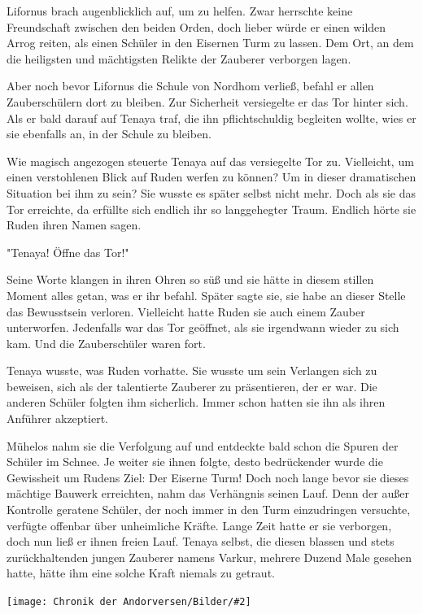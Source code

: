 \documentclass[10pt, a4paper, oneside]{book}
\newcommand{\bildmitts}[2][height=0.32\textwidth,width=0.48\textwidth,keepaspectratio]{%
    \begin{center}
        \texttt{[image: Chronik der Andorversen/Bilder/\#2]}
    \end{center}
}
\begin{document}
\begin{multicols}{2}
Lifornus brach augenblicklich auf, um zu helfen. Zwar herrschte keine Freundschaft zwischen den beiden Orden, doch lieber würde er einen wilden Arrog reiten, als einen Schüler in den Eisernen Turm zu lassen. Dem Ort, an dem die heiligsten und mächtigsten Relikte der Zauberer verborgen lagen.

Aber noch bevor Lifornus die Schule von Nordhom verließ, befahl er allen Zauberschülern dort zu bleiben. Zur Sicherheit versiegelte er das Tor hinter sich. Als er bald darauf auf Tenaya traf, die ihn pflichtschuldig begleiten wollte, wies er sie ebenfalls an, in der Schule zu bleiben.

Wie magisch angezogen steuerte Tenaya auf das versiegelte Tor zu. Vielleicht, um einen verstohlenen Blick auf Ruden werfen zu können? Um in dieser dramatischen Situation bei ihm zu sein? Sie wusste es später selbst nicht mehr. Doch als sie das Tor erreichte, da erfüllte sich endlich ihr so langgehegter Traum. Endlich hörte sie Ruden ihren Namen sagen.

"Tenaya! Öffne das Tor!"

Seine Worte klangen in ihren Ohren so süß und sie hätte in diesem stillen Moment alles getan, was er ihr befahl. Später sagte sie, sie habe an dieser Stelle das Bewusstsein verloren. Vielleicht hatte Ruden sie auch einem Zauber unterworfen. Jedenfalls war das Tor geöffnet, als sie irgendwann wieder zu sich kam. Und die Zauberschüler waren fort.

Tenaya wusste, was Ruden vorhatte. Sie wusste um sein Verlangen sich zu beweisen, sich als der talentierte Zauberer zu präsentieren, der er war. Die anderen Schüler folgten ihm sicherlich. Immer schon hatten sie ihn als ihren Anführer akzeptiert.

Mühelos nahm sie die Verfolgung auf und entdeckte bald schon die Spuren der Schüler im Schnee. Je weiter sie ihnen folgte, desto bedrückender wurde die Gewissheit um Rudens Ziel: Der Eiserne Turm! Doch noch lange bevor sie dieses mächtige Bauwerk erreichten, nahm das Verhängnis seinen Lauf. Denn der außer Kontrolle geratene Schüler, der noch immer in den Turm einzudringen versuchte, verfügte offenbar über unheimliche Kräfte. Lange Zeit hatte er sie verborgen, doch nun ließ er ihnen freien Lauf. Tenaya selbst, die diesen blassen und stets zurückhaltenden jungen Zauberer namens Varkur, mehrere Duzend Male gesehen hatte, hätte ihm eine solche Kraft niemals zu getraut.

\bildmitts{Tenaya die Wächterin des Feuers Bild 2.jpg}


\end{multicols}
\end{document}
